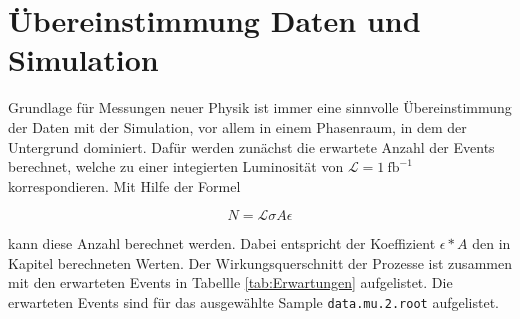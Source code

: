 \section{Übereinstimmung Daten und Simulation}
\label{sec:aufgabe6}

Grundlage für Messungen neuer Physik ist immer eine sinnvolle Übereinstimmung 
der Daten mit der Simulation, vor allem in einem Phasenraum, in dem der 
Untergrund dominiert. Dafür werden zunächst die erwartete Anzahl der Events 
berechnet, welche zu einer integierten Luminosität von 
$\mathcal{L} = \SI{1}{\femto\barn}^{-1}$ korrespondieren. Mit Hilfe der Formel 

\begin{equation}
N = \mathcal{L} \sigma A \epsilon
\label{eqn:erwartung}
\end{equation}

kann diese Anzahl berechnet werden. Dabei entspricht der Koeffizient 
$\epsilon * A$ den in Kapitel \label{sec:aufgabe3}
berechneten Werten. Der Wirkungsquerschnitt der Prozesse ist zusammen mit 
den erwarteten Events in Tabellle \ref{tab:Erwartungen} aufgelistet. Die erwarteten 
Events sind für das ausgewählte Sample \texttt{data.mu.2.root} aufgelistet.

